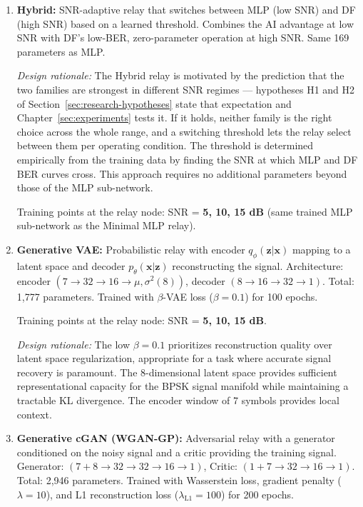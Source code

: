 \begin{enumerate}
\item \textbf{Hybrid:} SNR-adaptive relay that switches between MLP (low SNR) and DF (high SNR) based on a learned threshold. Combines the AI advantage at low SNR with DF's low-BER, zero-parameter operation at high SNR. Same 169 parameters as MLP.

  \emph{Design rationale:} The Hybrid relay is motivated by the prediction that the two families are strongest in different SNR regimes --- hypotheses H1 and H2 of Section~\ref{sec:research-hypotheses} state that expectation and Chapter~\ref{sec:experiments} tests it. If it holds, neither family is the right choice across the whole range, and a switching threshold lets the relay select between them per operating condition. The threshold is determined empirically from the training data by finding the SNR at which MLP and DF BER curves cross. This approach requires no additional parameters beyond those of the MLP sub-network.

  Training points at the relay node: SNR = \textbf{5, 10, 15 dB} (same trained MLP sub-network as the Minimal MLP relay).

\item \textbf{Generative VAE:} Probabilistic relay with encoder \(q_\phi(\mathbf{z}|\mathbf{x})\) mapping to a latent space and decoder \(p_\theta(\mathbf{x}|\mathbf{z})\) reconstructing the signal. Architecture: encoder \((7 \to 32 \to 16 \to \mu, \sigma^2(8))\), decoder \((8 \to 16 \to 32 \to 1)\). Total: 1,777 parameters. Trained with \(\beta\)-VAE loss (\(\beta=0.1\)) for 100 epochs.

  Training points at the relay node: SNR = \textbf{5, 10, 15 dB}.

  \emph{Design rationale:} The low \(\beta = 0.1\) prioritizes reconstruction quality over latent space regularization, appropriate for a task where accurate signal recovery is paramount. The 8-dimensional latent space provides sufficient representational capacity for the BPSK signal manifold while maintaining a tractable KL divergence. The encoder window of 7 symbols provides local context.
\item  \textbf{Generative cGAN (WGAN-GP):} Adversarial relay with a generator conditioned on the noisy signal and a critic providing the training signal. Generator: \((7+8 \to 32 \to 32 \to 16 \to 1)\), Critic: \((1+7 \to 32 \to 16 \to 1)\). Total: 2,946 parameters. Trained with Wasserstein loss, gradient penalty (\(\lambda=10\)), and L1 reconstruction loss (\(\lambda_{\text{L1}}=100\)) for 200 epochs.


\end{enumerate}

